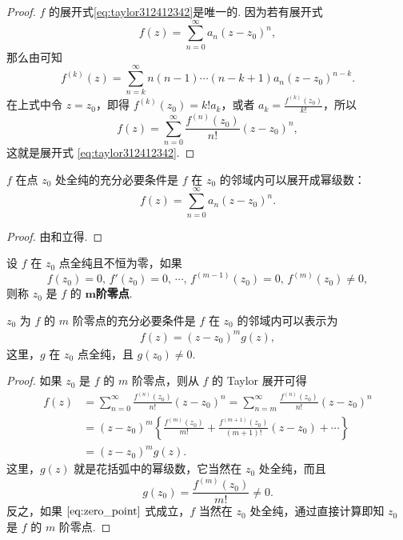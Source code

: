 \documentclass[../../main.tex]{subfiles}
\begin{document}
\begin{proof}
\( f \) 的展开式\eqref{eq:taylor312412342}是唯一的. 因为若有展开式
\[
f(z) = \sum_{n=0}^{\infty} a_n (z - z_0)^n,
\]
那么由可知
\[
f^{(k)}(z) = \sum_{n=k}^{\infty} n(n - 1) \cdots (n - k + 1) a_n (z - z_0)^{n - k}.
\]
在上式中令 \( z = z_0 \)，即得 \( f^{(k)}(z_0) = k! a_k \)，或者 \( a_k = \frac{f^{(k)}(z_0)}{k!} \)，所以
\[
f(z) = \sum_{n=0}^{\infty} \frac{f^{(n)}(z_0)}{n!} (z - z_0)^n,
\]
这就是展开式 \eqref{eq:taylor312412342}.

\end{proof}

\begin{theorem}\label{theorem:定理4.3.2}
\( f \) 在点 \( z_0 \) 处全纯的充分必要条件是 \( f \) 在 \( z_0 \) 的邻域内可以展开成幂级数：
\[
f(z) = \sum_{n=0}^{\infty} a_n (z - z_0)^n.
\]
\end{theorem}
\begin{proof}
由和立得.

\end{proof}

\begin{definition}
设 \( f \) 在 \( z_0 \) 点全纯且不恒为零，如果
\[
f(z_0) = 0, \, f'(z_0) = 0, \, \cdots, \, f^{(m - 1)}(z_0) = 0, \, f^{(m)}(z_0) \neq 0,
\]
则称 \( z_0 \) 是 \( f \) 的 $\boldsymbol{m}$\textbf{阶零点}.
\end{definition}

\begin{proposition}\label{proposition:命题4.3.4}
\( z_0 \) 为 \( f \) 的 \( m \) 阶零点的充分必要条件是 \( f \) 在 \( z_0 \) 的邻域内可以表示为
\begin{align}
f(z) = (z - z_0)^m g(z), \label{eq:zero_point}
\end{align}
这里，\( g \) 在 \( z_0 \) 点全纯，且 \( g(z_0) \neq 0 \).
\end{proposition}
\begin{proof}
如果 \( z_0 \) 是 \( f \) 的 \( m \) 阶零点，则从 \( f \) 的 Taylor 展开可得
\begin{align*}
f(z) &= \sum_{n=0}^{\infty} \frac{f^{(n)}(z_0)}{n!} (z - z_0)^n = \sum_{n=m}^{\infty} \frac{f^{(n)}(z_0)}{n!} (z - z_0)^n \\
&= (z - z_0)^m \left\{ \frac{f^{(m)}(z_0)}{m!} + \frac{f^{(m + 1)}(z_0)}{(m + 1)!} (z - z_0) + \cdots \right\} \\
&= (z - z_0)^m g(z).
\end{align*}
这里，\( g(z) \) 就是花括弧中的幂级数，它当然在 \( z_0 \) 处全纯，而且
\[
g(z_0) = \frac{f^{(m)}(z_0)}{m!} \neq 0.
\]
反之，如果 \(\eqref{eq:zero_point}\) 式成立，\( f \) 当然在 \( z_0 \) 处全纯，通过直接计算即知 \( z_0 \) 是 \( f \) 的 \( m \) 阶零点.

\end{proof}
\end{document}
